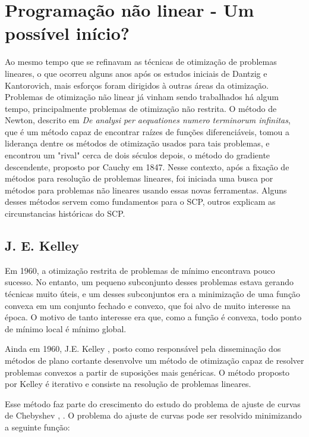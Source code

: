 \section{Programação não linear - Um possível início?}
\label{secao_historia}

Ao mesmo tempo que se refinavam as técnicas de otimização de problemas lineares, o que ocorreu
alguns anos após os estudos iniciais de Dantzig e Kantorovich, mais esforços foram dirigidos à
outras áreas da otimização. Problemas de otimização não linear já vinham sendo trabalhados
há algum tempo, principalmente problemas de otimização não restrita. O método de Newton, descrito
em \textit{De analysi per aequationes numero terminorum infinitas}, que é um método capaz de encontrar
raízes de funções diferenciáveis, tomou a liderança dentre os métodos de otimização usados para
tais problemas, e encontrou um "rival" cerca de dois séculos depois, o método do gradiente
descendente, proposto por Cauchy \cite{lemarechal2012cauchy} em 1847. Nesse contexto, após
a fixação de métodos para resolução de problemas lineares, foi iniciada uma busca por métodos para
problemas não lineares usando essas novas ferramentas. Alguns desses métodos servem como fundamentos
para o SCP, outros explicam as circunstancias históricas do SCP.

\subsection{J. E. Kelley}

Em 1960, a otimização restrita de problemas de mínimo encontrava pouco sucesso. No
entanto, um pequeno subconjunto desses problemas estava gerando técnicas muito úteis, e um desses
subconjuntos era a minimização de uma função convexa em um conjunto fechado e convexo, que foi
alvo de muito interesse na época. O motivo de tanto interesse era que, como a função é convexa,
todo ponto de mínimo local é mínimo global.

Ainda em 1960, J.E. Kelley \cite{kelley1960cutting}, posto como responsável pela disseminação dos
métodos de plano cortante desenvolve um método de otimização capaz de resolver problemas convexos
a partir de suposições mais genéricas. O método proposto por Kelley é iterativo e consiste na
resolução de problemas lineares.

Esse método faz parte do crescimento do estudo do problema de ajuste de curvas de Chebyshev
\cite{kelley1959computational}, \cite{kelley1958application}. O problema do ajuste de curvas pode
ser resolvido minimizando a seguinte função:

